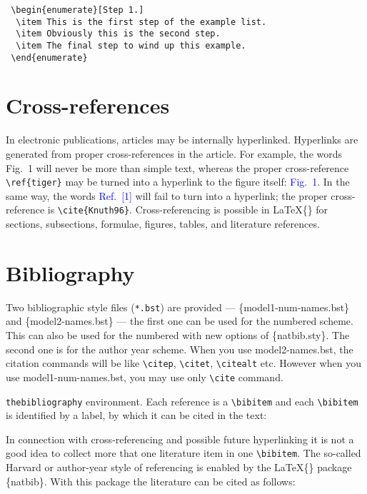 \documentclass[]{elsarticle} %
\begin{document}
\begin{verbatim}
 \begin{enumerate}[Step 1.]
  \item This is the first step of the example list.
  \item Obviously this is the second step.
  \item The final step to wind up this example.
 \end{enumerate}
\end{verbatim}

\section{Cross-references}

In electronic publications, articles may be internally hyperlinked.
Hyperlinks are generated from proper cross-references in the article.
For example, the words \textcolor{black!80}{Fig.~1} will never be more
than simple text, whereas the proper cross-reference \verb+\ref{tiger}+
may be turned into a hyperlink to the figure itself:
\textcolor{blue}{Fig.~1}. In the same way, the words
\textcolor{blue}{Ref.~[1]} will fail to turn into a hyperlink; the
proper cross-reference is \verb+\cite{Knuth96}+. Cross-referencing is
possible in \LaTeX\{\} for sections, subsections, formulae, figures,
tables, and literature references.

\section{Bibliography}

Two bibliographic style files (\verb+*.bst+) are provided ---
\{model1-num-names.bst\} and \{model2-names.bst\} --- the first one can
be used for the numbered scheme. This can also be used for the numbered
with new options of \{natbib.sty\}. The second one is for the author
year scheme. When you use model2-names.bst, the citation commands will
be like \verb+\citep+, \verb+\citet+, \verb+\citealt+ etc. However when
you use model1-num-names.bst, you may use only \verb+\cite+ command.

\verb+thebibliography+ environment. Each reference is a\linebreak
\verb+\bibitem+ and each \verb+\bibitem+ is identified by a label, by
which it can be cited in the text:

\noindent In connection with cross-referencing and possible future
hyperlinking it is not a good idea to collect more that one literature
item in one \verb+\bibitem+. The so-called Harvard or author-year style
of referencing is enabled by the \LaTeX\{\} package \{natbib\}. With
this package the literature can be cited as follows:
\end{document}
